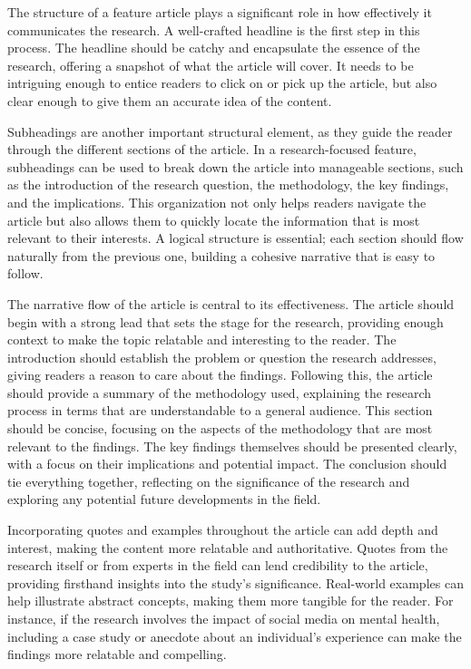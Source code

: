 \documentclass[
]{book}
\begin{document}
The structure of a feature article plays a significant role in how effectively it communicates the research. A well-crafted headline is the first step in this process. The headline should be catchy and encapsulate the essence of the research, offering a snapshot of what the article will cover. It needs to be intriguing enough to entice readers to click on or pick up the article, but also clear enough to give them an accurate idea of the content.

Subheadings are another important structural element, as they guide the reader through the different sections of the article. In a research-focused feature, subheadings can be used to break down the article into manageable sections, such as the introduction of the research question, the methodology, the key findings, and the implications. This organization not only helps readers navigate the article but also allows them to quickly locate the information that is most relevant to their interests. A logical structure is essential; each section should flow naturally from the previous one, building a cohesive narrative that is easy to follow.

The narrative flow of the article is central to its effectiveness. The article should begin with a strong lead that sets the stage for the research, providing enough context to make the topic relatable and interesting to the reader. The introduction should establish the problem or question the research addresses, giving readers a reason to care about the findings. Following this, the article should provide a summary of the methodology used, explaining the research process in terms that are understandable to a general audience. This section should be concise, focusing on the aspects of the methodology that are most relevant to the findings. The key findings themselves should be presented clearly, with a focus on their implications and potential impact. The conclusion should tie everything together, reflecting on the significance of the research and exploring any potential future developments in the field.

Incorporating quotes and examples throughout the article can add depth and interest, making the content more relatable and authoritative. Quotes from the research itself or from experts in the field can lend credibility to the article, providing firsthand insights into the study's significance. Real-world examples can help illustrate abstract concepts, making them more tangible for the reader. For instance, if the research involves the impact of social media on mental health, including a case study or anecdote about an individual's experience can make the findings more relatable and compelling.
\end{document}
